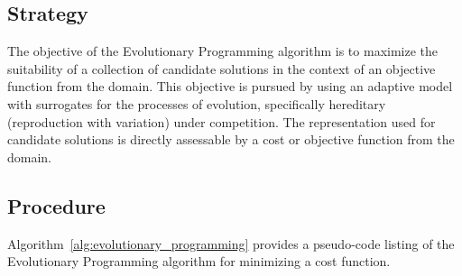 \subsection{Strategy}
The objective of the Evolutionary Programming algorithm is to maximize the suitability of a collection of candidate solutions in the context of an objective function from the domain.
This objective is pursued by using an adaptive model with surrogates for the processes of evolution, specifically hereditary (reproduction with variation) under competition. The representation used for candidate solutions is directly assessable by a cost or objective function from the domain. 

\subsection{Procedure}
Algorithm~\ref{alg:evolutionary_programming} provides a pseudo-code listing of the Evolutionary Programming algorithm for minimizing a cost function. 

